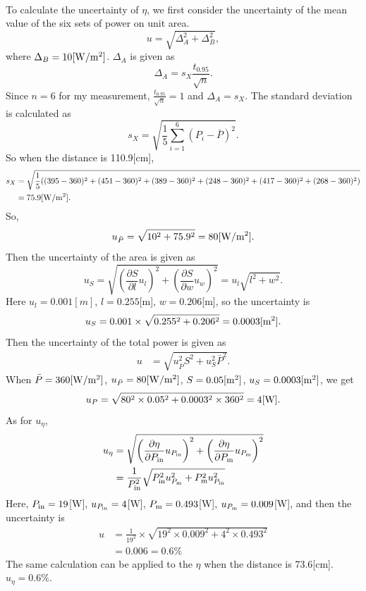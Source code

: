 \documentclass[a4paper]{article}
\begin{document}
    \paragraph{} To calculate the uncertainty of $\eta$, we first consider the uncertainty of the mean value of the six sets of power on unit area. $$u=\sqrt{\Delta_A^2+\Delta_B^2},$$ where $\Delta_B=10[\rm W/m^2]$. $\Delta_A$ is given as $$\Delta_A=s_X\frac{t_{0.95}}{\sqrt{n}}.$$ Since $n=6$ for my measurement, $\frac{t_{0.95}}{\sqrt n}=1$ and $\Delta_A=s_X$. The standard deviation is calculated as $$s_X=\sqrt{\frac{1}{5}\sum_{i=1}^6(P_i-\bar{P})^2}.$$ So when the distance is 110.9[cm], 
    \begin{equation*}
        \begin{split}
            s_X&=\sqrt{\frac{1}{5}((395-360)^2+(451-360)^2+(389-360)^2+(248-360)^2+(417-360)^2+(268-360)^2)}\\
            &=75.9[\rm W/m^2].
        \end{split}
    \end{equation*}
    So, $$u_{\bar{P}}=\sqrt{10^2+75.9^2}=80[\rm W/m^2].$$ Then the uncertainty of the area is given as $$u_S=\sqrt{\left(\frac{\partial S}{\partial l}u_l\right)^2+\left(\frac{\partial S}{\partial w}u_w\right)^2}=u_l\sqrt{l^2+w^2}.$$ Here $u_l=0.001[m]$, $l=0.255$[m], $w=0.206$[m], so the uncertainty is $$u_S=0.001\times\sqrt{0.255^2+0.206^2}=0.0003[\rm m^2].$$ Then the uncertainty of the total power is given as 
    \begin{equation*}
        \begin{split}
            u&=\sqrt{u_{\bar{P}}^2S^2+u_S^2\bar{P}^2}.
        \end{split}
    \end{equation*}
    When $\bar{P}=360[\rm W/m^2]$, $u_{\bar{P}}=80[\rm W/m^2]$, $S=0.05[\rm m^2]$, $u_S=0.0003[\rm m^2]$, we get $$u_P=\sqrt{80^2\times 0.05^2+0.0003^2\times 360^2}=4[\rm W].$$ As for $u_\eta$, 
    \begin{equation*}
        \begin{split}
            u_\eta&=\sqrt{\left(\frac{\partial \eta}{\partial P_{\rm in}}u_{P_{\rm in}}\right)^2+\left(\frac{\partial \eta}{\partial P_{\rm m}}u_{P_{\rm m}}\right)^2}\\
            &=\frac{1}{P_{\rm in}^2}\sqrt{P_{\rm in}^2u_{P_{\rm m}}^2+P_{\rm m}^2u_{P_{\rm in}}^2}
        \end{split}
    \end{equation*}
    Here, $P_{\rm in}=19$[W], $u_{P_{\rm in}}=4$[W], $P_{\rm m}=0.493$[W], $u_{P_{\rm m}}=0.009$[W], and then the uncertainty is 
    \begin{equation*}
        \begin{split}
            u&=\frac{1}{19^2}\times \sqrt{19^2\times 0.009^2+4^2\times 0.493^2}\\
            &=0.006=0.6\%
        \end{split}
    \end{equation*} 
    The same calculation can be applied to the $\eta$ when the distance is 73.6[cm]. $u_\eta=0.6\%$.
\end{document}
